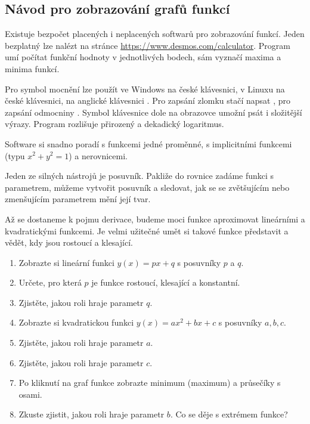 \subsection{Návod pro zobrazování grafů funkcí}

Existuje bezpočet placených i neplacených softwarů pro zobrazování funkcí. Jeden bezplatný lze nalézt na stránce \url{https://www.desmos.com/calculator}. Program umí počítat funkční hodnoty v jednotlivých bodech, sám vyznačí maxima a minima funkcí.

Pro symbol mocnění lze použít  ve Windows na české klávesnici,  v Linuxu na české klávesnici, na anglické klávesnici .
Pro zapsání zlomku stačí napsat , pro zapsání odmocniny . Symbol klávesnice dole na obrazovce umožní psát i složitější výrazy. Program rozlišuje přirozený  a dekadický  logaritmus. 

Software si snadno poradí s funkcemi jedné proměnné, s implicitními funkcemi (typu $x^2+y^2=1$) a nerovnicemi.

Jeden ze silných nástrojů je posuvník. Pakliže do rovnice zadáme funkci s parametrem, můžeme vytvořit posuvník a sledovat, jak se se zvětšujícím nebo zmenšujícím parametrem mění její tvar.

\begin{exercise}
    Až se dostaneme k pojmu derivace, budeme moci funkce aproximovat lineárními a kvadratickými funkcemi. Je velmi užitečné umět si takové funkce představit a vědět, kdy jsou rostoucí a klesající.
    \begin{enumerate}
        \item Zobrazte si lineární funkci $y(x) = px + q$ s posuvníky $p$ a $q$.
        \item Určete, pro která $p$ je funkce rostoucí, klesající a konstantní.
        \item Zjistěte, jakou roli hraje parametr $q$.
        \item Zobrazte si kvadratickou funkci $y(x) = ax^2 + bx +c$ s posuvníky $a,b,c$.
        \item Zjistěte, jakou roli hraje parametr $a$.
        \item Zjistěte, jakou roli hraje parametr $c$.
        \item Po kliknutí na graf funkce zobrazte minimum (maximum) a průsečíky s osami.
        \item Zkuste zjistit, jakou roli hraje parametr $b$. Co se děje s extrémem funkce?
    \end{enumerate}
\end{exercise}

